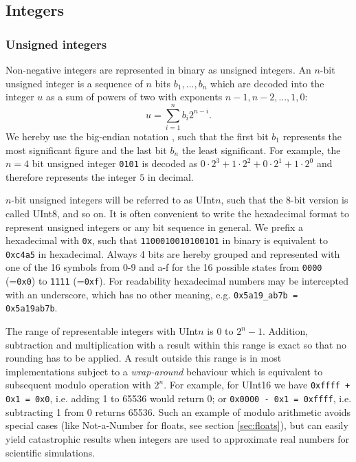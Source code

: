 \subsection{Integers}
\label{sec:integers}

\subsubsection{Unsigned integers}
\label{sec:uint}

Non-negative integers are represented in binary as unsigned integers. An $n$-bit unsigned integer is a sequence of $n$ bits
$b_1, ..., b_n$ which are decoded into the integer $u$ as a sum of powers of two with exponents $n-1,n-2,...,1,0$:
\begin{equation}
	u = \sum_{i=1}^{n} b_i 2^{n-i}.
	\label{eq:uint}
\end{equation}
We hereby use the big-endian notation \citep{Cohen1981,James1990}, such that the first bit $b_1$ represents the most significant figure and the last bit $b_n$ the
least significant. For example, the $n=4$ bit unsigned integer \texttt{0101} is decoded as
$0 \cdot 2^3 + 1 \cdot 2^2 + 0 \cdot 2^1 + 1 \cdot 2^0$ and therefore represents the integer $5$ in decimal.

$n$-bit unsigned integers will be referred to as UInt$n$, such that the 8-bit version is called UInt8, and so on. It is often convenient to
write the hexadecimal format to represent unsigned integers or any bit sequence in general. We prefix a hexadecimal with
\texttt{0x}, such that \texttt{1100010010100101} in binary is equivalent to \texttt{0xc4a5} in hexadecimal. Always 4 bits are hereby
grouped and represented with one of the 16 symbols from 0-9 and a-f for the 16 possible states from \texttt{0000} (=\texttt{0x0})
to \texttt{1111} (=\texttt{0xf}). For readability hexadecimal numbers may be intercepted with an underscore, which has no
other meaning, e.g. \texttt{0x5a19\_ab7b = 0x5a19ab7b}.

The range of representable integers with UInt$n$ is 0 to $2^n-1$. Addition, subtraction and multiplication with a result within this
range is exact so that no rounding has to be applied. A result outside this range is in most implementations subject to a \emph{wrap-around}
behaviour which is equivalent to subsequent modulo operation with $2^n$. For example, for UInt16 we have \texttt{0xffff + 0x1 = 0x0}, i.e.
adding 1 to 65536 would return 0; or \texttt{0x0000 - 0x1 = 0xffff}, i.e. subtracting 1 from 0 returns 65536. Such an example of modulo
arithmetic avoids special cases (like Not-a-Number for floats, see section \ref{sec:floats}), but can easily yield catastrophic results when integers
are used to approximate real numbers for scientific simulations.

